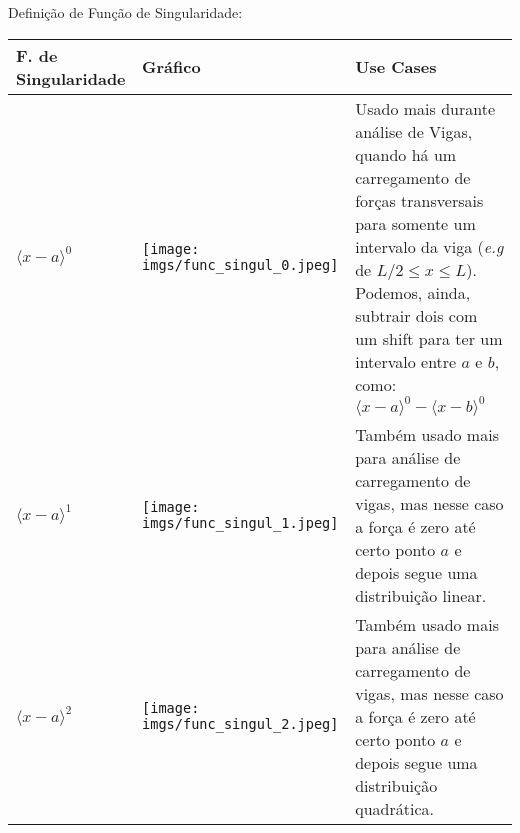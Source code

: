 \documentclass{article}
\begin{document}
        Definição de Função de Singularidade:
        \begin{table}[h]
            \tiny
            \centering
            \begin{tabularx}{\textwidth}{|X|X|l|}\hline
                \textbf{F. de Singularidade} & \textbf{Gráfico} & \textbf{Use Cases} \\ \hline
                $\langle x - a\rangle^0$ & 
                    \begin{minipage}{.3\textwidth}
                        \centering
                        \texttt{[image: imgs/func\_singul\_0.jpeg]}
                    \end{minipage}&
                    \begin{minipage}{.4\textwidth}
                        Usado mais durante análise de Vigas, quando há um carregamento de forças transversais para somente um intervalo da viga (\emph{e.g} de $L/2 \le x \le L$). Podemos,
                        ainda, subtrair dois com um shift para ter um intervalo entre $a$ e $b$, como: $\langle x - a\rangle^0 - \langle x - b\rangle^0$ 
                    \end{minipage}  \\ \hline

                $\langle x - a\rangle^1$ & 
                    \begin{minipage}{.3\textwidth}
                        \centering
                        \texttt{[image: imgs/func\_singul\_1.jpeg]}
                    \end{minipage}&
                    \begin{minipage}{.4\textwidth}
                        Também usado mais para análise de carregamento de vigas, mas nesse caso a força é zero até certo ponto $a$ e depois segue uma distribuição linear.
                    \end{minipage}  \\ \hline

                $\langle x - a\rangle^2$ & 
                    \begin{minipage}{.3\textwidth}
                        \centering
                        \texttt{[image: imgs/func\_singul\_2.jpeg]}
                    \end{minipage}&
                    \begin{minipage}{.4\textwidth}
                        Também usado mais para análise de carregamento de vigas, mas nesse caso a força é zero até certo ponto $a$ e depois segue uma distribuição quadrática.
                    \end{minipage}  \\ \hline
                

\end{tabularx}
\end{table}
\end{document}
